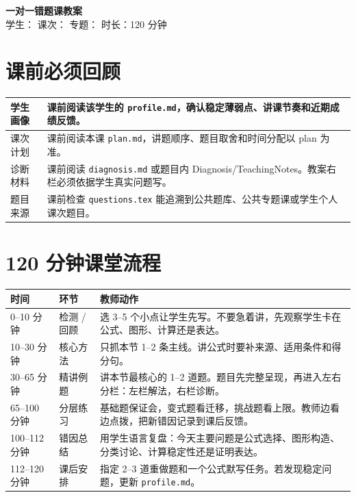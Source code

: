 \documentclass[11pt,a4paper]{ctexart}
\begin{document}
\begin{center}
  {\Large\bfseries 一对一错题课教案}\\
  \vspace{0.5em}
  学生：\blank{2.4cm}
  \quad
  课次：\blank{1.4cm}
  \quad
  专题：\blank{3.2cm}
  \quad
  时长：120 分钟
\end{center}

\section{课前必须回顾}

\begin{tabularx}{\textwidth}{p{4cm}X}
\toprule
学生画像 & 课前阅读该学生的 \texttt{profile.md}，确认稳定薄弱点、讲课节奏和近期成绩反馈。\\ \hline
课次计划 & 课前阅读本课 \texttt{plan.md}，讲题顺序、题目取舍和时间分配以 plan 为准。\\ \hline
诊断材料 & 课前阅读 \texttt{diagnosis.md} 或题目内 Diagnosis/TeachingNotes。教案右栏必须依据学生真实问题写。\\ \hline
题目来源 & 课前检查 \texttt{questions.tex} 能追溯到公共题库、公共专题课或学生个人课次题目。\\
\bottomrule
\end{tabularx}

\section{120 分钟课堂流程}

\begin{tabularx}{\textwidth}{p{2.8cm}p{3.2cm}X}
\toprule
时间 & 环节 & 教师动作\\
\midrule
0--10 分钟 & 检测 / 回顾 & 选 3--5 个小点让学生先写。不要急着讲，先观察学生卡在公式、图形、计算还是表达。\\ \hline
10--30 分钟 & 核心方法 & 只抓本节 1--2 条主线。讲公式时要补来源、适用条件和得分句。\\ \hline
30--65 分钟 & 精讲例题 & 讲本节最核心的 1--2 道题。题目先完整呈现，再进入左右分栏：左栏解法，右栏诊断。\\ \hline
65--100 分钟 & 分层练习 & 基础题保证会，变式题看迁移，挑战题看上限。教师边看边点拨，把新错因记录到课后反馈。\\ \hline
100--112 分钟 & 错因总结 & 用学生语言复盘：今天主要问题是公式选择、图形构造、分类讨论、计算稳定性还是证明表达。\\ \hline
112--120 分钟 & 课后安排 & 指定 2--3 道重做题和一个公式默写任务。若发现稳定问题，更新 \texttt{profile.md}。\\
\bottomrule
\end{tabularx}
\end{document}

